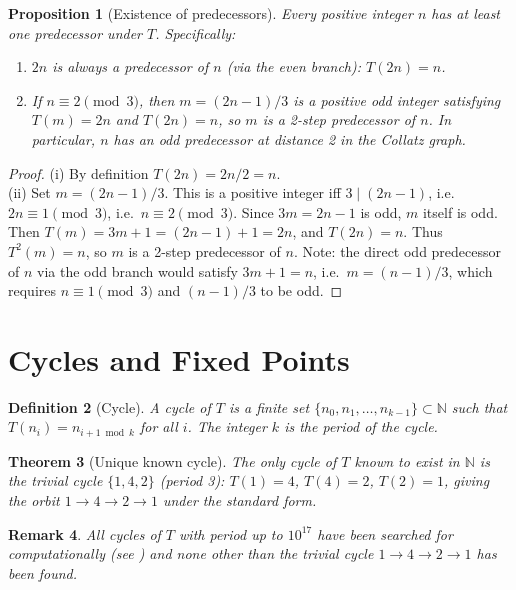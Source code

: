 \documentclass[12pt,a4paper]{article}
\newtheorem{theorem}{Theorem}[section]
\newtheorem{proposition}[theorem]{Proposition}
\newtheorem{definition}[theorem]{Definition}
\newtheorem{remark}[theorem]{Remark}
\begin{document}
\begin{proposition}[Existence of predecessors]\label{prop:pred}
Every positive integer $n$ has at least one predecessor under $T$. Specifically:
\begin{enumerate}
  \item[(i)] $2n$ is always a predecessor of $n$ (via the even branch): $T(2n) = n$.
  \item[(ii)] If $n \equiv 2 \pmod{3}$, then $m = (2n-1)/3$ is a positive odd integer
              satisfying $T(m) = 2n$ and $T(2n) = n$, so $m$ is a 2-step predecessor of $n$.
              In particular, $n$ has an odd predecessor at distance 2 in the Collatz graph.
\end{enumerate}
\end{proposition}

\begin{proof}
(i) By definition $T(2n) = 2n/2 = n$.\\
(ii) Set $m = (2n-1)/3$. This is a positive integer iff $3 \mid (2n-1)$, i.e.\
$2n \equiv 1 \pmod{3}$, i.e.\ $n \equiv 2 \pmod{3}$. Since $3m = 2n-1$ is odd,
$m$ itself is odd. Then $T(m) = 3m + 1 = (2n-1) + 1 = 2n$, and $T(2n) = n$.
Thus $T^2(m) = n$, so $m$ is a 2-step predecessor of $n$.
Note: the direct odd predecessor of $n$ via the odd branch would satisfy $3m + 1 = n$,
i.e.\ $m = (n-1)/3$, which requires $n \equiv 1 \pmod{3}$ and $(n-1)/3$ to be odd.
\end{proof}

\section{Cycles and Fixed Points}

\begin{definition}[Cycle]\label{def:cycle}
A \emph{cycle} of $T$ is a finite set $\{n_0, n_1, \ldots, n_{k-1}\} \subset \mathbb{N}$
such that $T(n_i) = n_{i+1 \bmod k}$ for all $i$. The integer $k$ is the \emph{period}
of the cycle.
\end{definition}

\begin{theorem}[Unique known cycle]\label{thm:cycle}
The only cycle of $T$ known to exist in $\mathbb{N}$ is the \emph{trivial cycle}
$\{1, 4, 2\}$ (period 3): $T(1) = 4$, $T(4) = 2$, $T(2) = 1$, giving the
orbit $1 \to 4 \to 2 \to 1$ under the standard form.
\end{theorem}

\begin{remark}\label{rem:cycle_search}
All cycles of $T$ with period up to $10^{17}$ have been searched for computationally
(see \cite{Leavens1992}) and none other than the trivial cycle $1 \to 4 \to 2 \to 1$
has been found.
\end{remark}
\end{document}
